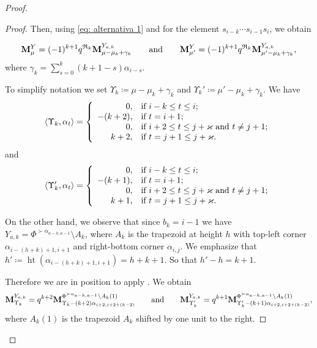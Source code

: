 \begin{proof}
\begin{proof}
Then, using  \eqref{eq: alternativa 1}  and  for the element $s_{i-k}\cdots s_{i-1}s_i $, we obtain 

        \begin{equation} \label{eq: alternativa 2}
        \mathbf{M}_{\mu}^{Y} = (-1)^{k+1}q^{\mathfrak{R}_k}\mathbf{M}_{\mu- \mu_k  +\gamma_k}^{Y_{a,k}}  \qquad \mbox{and} \qquad   \mathbf{M}_{\mu'}^{Y} = (-1)^{k+1}q^{\mathfrak{R}_k}\mathbf{M}_{\mu'- \mu_k +\gamma_k}^{Y_{a,k}}, 
    \end{equation}
where $\gamma_{k} =\displaystyle \sum_{s=0}^k (k+1-s) \alpha_{i-s}$. 

To simplify notation we set $ \Upsilon_k \coloneqq \mu- \mu_k  +\gamma_k$ and $\Upsilon_k'\coloneqq\mu'- \mu_k  +\gamma_k$. 
We have
\begin{equation} \label{eq: upsilon }
    \langle \Upsilon_k , \alpha_t \rangle = \left\{  
    \begin{array}{rl}
      0,    & \mbox{if } i-k \leq t \leq i; \\
      -(k+2),    & \mbox{if } t=i+1; \\
      0,  & \mbox{if }  i+2\leq  t \leq j+\varkappa \mbox{ and } t\neq j+1;\\
      k+2, & \mbox{if }  t=j+1 \leq j+\varkappa.
    \end{array} \right.
\end{equation}
and 
\begin{equation} \label{eq: upsilon prime}
  \langle \Upsilon_k' , \alpha_t \rangle = \left\{  
    \begin{array}{rl}
      0,    & \mbox{if } i-k \leq t \leq i; \\
      -(k+1),    & \mbox{if } t=i+1; \\
      0,  & \mbox{if }  i+2\leq  t \leq j+\varkappa \mbox{ and } t\neq j+1;\\
      k+1, & \mbox{if }  t=j+1 \leq  j+\varkappa.
    \end{array} \right.
\end{equation}


On the other hand, we observe that  since $b_k=i-1$ we have $Y_{a,k}=\Phi^{\succ \alpha_{a-h,a-1}} \setminus A_k$, where $A_k$ is the trapezoid at height $h$ with top-left corner $\alpha_{i-(h+k)+1,i+1}$ and right-bottom corner $\alpha_{i,j}$. 
We emphasize that $h' \coloneq \operatorname{ht} (\alpha_{i-(h+k)+1,i+1}) = h+k+1$. 
So that $h'-h=k+1 $. 

Therefore we are in position to apply . 
We obtain
\begin{equation}
    \mathbf{M}_{\Upsilon_k}^{Y_{a,k}} =q^{k+2} \mathbf{M}_{\Upsilon_k-(k+2)\alpha_{i+2,i+2+(h-2)}}^{\Phi^{\succ \alpha_{a-h,a-1}} \setminus A_{k}(1)} \qquad \mbox{and} \qquad  \mathbf{M}_{\Upsilon_k'}^{Y_{a,k}} =q^{k+1} \mathbf{M}_{\Upsilon_k'-(k+1)\alpha_{i+2,i+2+(h-2)}}^{\Phi^{\succ \alpha_{a-h,a-1}} \setminus A_{k}(1)},
\end{equation}
where $A_k(1)$ is the trapezoid $A_k$ shifted by one unit to the right. 


\end{proof}
\end{proof}
